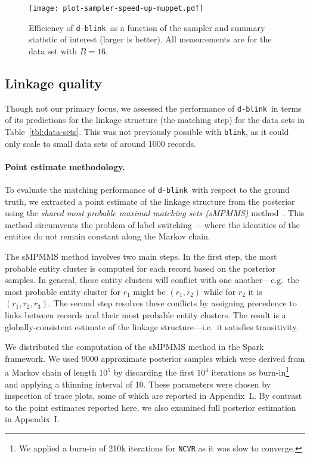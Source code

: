 \documentclass[12pt,letterpaper]{article}
\newcommand{\1}[1]{\mathbb{I}\!\left[#1\right]} %
\newcommand{\dblink}{\texttt{\upshape \lowercase{d-blink}}} %
\newcommand{\blink}{\texttt{\upshape \lowercase{blink}}} %
\begin{document}
\begin{figure}[t]
  \centering
  \texttt{[image: plot-sampler-speed-up-muppet.pdf]}
  \caption{Efficiency of \dblink\ as a function of the 
    sampler and summary statistic of interest (larger is better).
    All measurements are for the  data set with 
    $B = 16$.
    }
  \label{fig:speed-up-vs-sampler}
\end{figure}

\subsection{Linkage quality}
\label{sec:linkage-quality}
Though not our primary focus, we assessed the performance of \dblink\ 
in terms of its predictions for the linkage structure (the matching step) 
for the data sets in Table~\ref{tbl:data-sets}.
This was not previously possible with \blink, as it could only scale to 
small data sets of around 1000 records.

\paragraph{Point estimate methodology.}
To evaluate the matching performance of \dblink\ with respect to the ground 
truth, we extracted a point estimate of the linkage structure from the 
posterior using the \emph{shared most probable maximal matching sets (sMPMMS)} 
method~\citep{steorts_bayesian_2016}.
This method circumvents the problem of label 
switching~\citep{jasra_markov_2005}---where the identities of the entities 
do not remain constant along the Markov chain.

The sMPMMS method involves two main steps.
In the first step, the most probable entity cluster is computed for each 
record based on the posterior samples.
In general, these entity clusters will conflict with one another---e.g.\ 
the most probable entity cluster for $r_1$ might be $(r_1, r_2)$ while for 
$r_2$ it is $(r_1, r_2, r_3)$.
The second step resolves these conflicts by assigning precedence to links 
between records and their most probable entity clusters.
The result is a globally-consistent estimate of the linkage structure---i.e.\ 
it satisfies transitivity.

We distributed the computation of the sMPMMS method in the Spark framework.
We used $9000$ approximate posterior samples which were derived from a 
Markov chain of length $10^5$ by discarding the first $10^4$ iterations 
as burn-in\footnote{We applied a burn-in of 210k iterations for 
  \texttt{NCVR} as it was slow to converge.} 
and applying a thinning interval of 10.
These parameters were chosen by inspection of trace plots, some of which 
are reported in Appendix~L.
By contrast to the point estimates reported here, we also examined full 
posterior estimation in Appendix~I.
\end{document}

